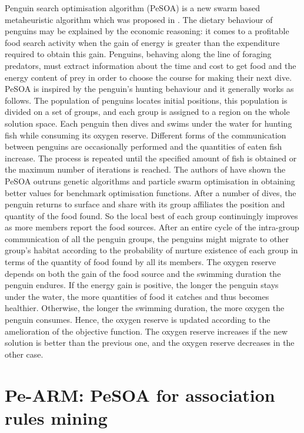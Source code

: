 \documentclass[preprint,12pt]{elsarticle}
\begin{document}
Penguin search optimisation algorithm (PeSOA) is a new swarm based metaheuristic algorithm which was proposed in \cite{15}. The dietary behaviour of penguins may be explained by the economic reasoning: it comes to a profitable food search activity when the gain of energy is greater than the expenditure required to obtain this gain. Penguins, behaving along the line of foraging predators, must extract information about the time and cost to get food and the energy content of prey in order to choose the course for making their next dive.
 PeSOA is inspired by the penguin’s hunting behaviour and it generally works as follows. The population of penguins locates initial positions, this population is divided on a set of groups, and each group is assigned to a region on the whole solution space. Each penguin then dives and swims under the water for hunting fish while consuming its oxygen reserve. Different forms of the communication between penguins are occasionally performed and the quantities of eaten fish increase. The process is repeated until the specified amount of fish is obtained or the maximum number of iterations is reached. The authors of \cite{15} have shown the PeSOA outruns genetic algorithms and particle swarm optimisation in obtaining better values for benchmark optimisation functions. 
After a number of dives, the penguin returns to surface and share with its group affiliates the position and quantity of the food found. So the local best of each group continuingly
 improves as more members report the food sources. After an entire cycle of the intra-group communication of all the penguin groups, the penguins might migrate to other group’s habitat according to the probability of nurture existence of each group in terms of the quantity of food found by all its members.
The oxygen reserve depends on both the gain of the food source and the swimming duration the penguin endures. If the energy gain is positive, the longer the penguin stays under the water, the more quantities of food it catches and thus becomes healthier. Otherwise, the longer the swimming duration, the more oxygen the penguin consumes. Hence, the oxygen reserve is updated according to the amelioration of the objective function. The oxygen reserve increases if the new solution is better than the previous one, and the oxygen reserve decreases in the other case.
\section{Pe-ARM: PeSOA for association rules mining}
\end{document}
